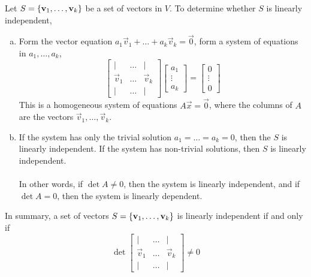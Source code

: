 \documentclass[letterpaper,12pt]{article}
\begin{document}
Let $S = \left\{ \mathbf{v}_1, \dots, \mathbf{v}_k \right\}$ be a set of vectors in $V$. To determine whether $S$ is linearly independent,
\begin{enumerate}[(a)]
    \item Form the vector equation $a_1 \vec{v}_1 + \dots + a_k \vec{v}_k = \vec{0}$, form a system of equations in $a_1, \dots, a_k$,
    \begin{equation*}
        \begin{bmatrix} \mid & \dots & \mid \\
        \vec{v}_1 & \dots & \vec{v}_k \\
        \mid & \dots & \mid \end{bmatrix} \begin{bmatrix} a_1 \\ \vdots \\ a_k \end{bmatrix} = \begin{bmatrix} 0 \\ \vdots \\ 0 \end{bmatrix}
    \end{equation*}
    This is a homogeneous system of equations $A\vec{x} = \vec{0}$, where the columns of $A$ are the vectors $\vec{v}_1, \dots, \vec{v}_k$.
    \item If the system has only the trivial solution $a_1 = \dots = a_k = 0$, then the $S$ is linearly independent. If the system has non-trivial solutions, then $S$ is linearly independent.
    \\ \\ In other words, if $\det{A} \neq 0$, then the system is linearly independent, and if $\det{A} = 0$, then the system is linearly dependent.
\end{enumerate}

In summary, a set of vectors $S = \left\{ \mathbf{v}_1, \dots, \mathbf{v}_k \right\}$ is linearly independent if and only if
\begin{equation*}
    \det{\begin{bmatrix} \mid & \dots & \mid \\
    \vec{v}_1 & \dots & \vec{v}_k \\
    \mid & \dots & \mid \end{bmatrix}} \neq 0
\end{equation*}
\end{document}
